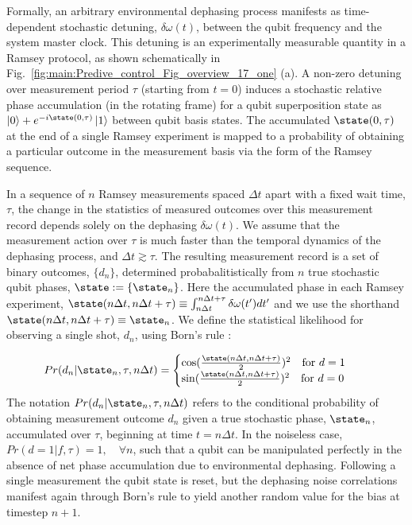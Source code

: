 Formally, an arbitrary environmental dephasing process manifests as time-dependent stochastic detuning, $\delta \omega (t)$, between the qubit frequency and the system master clock. This detuning is an experimentally measurable quantity in a Ramsey protocol, as shown schematically in Fig.~\ref{fig:main:Predive_control_Fig_overview_17_one} (a). A non-zero detuning over measurement period $\tau$ (starting from $t=0$) induces a stochastic relative phase accumulation (in the rotating frame) for a qubit superposition state as $\left|0\right\rangle+e^{-i\state(0, \tau)}\left|1\right\rangle$ between qubit basis states.  The accumulated $\state(0, \tau)$ at the end of a single Ramsey experiment is mapped to a probability of obtaining a particular outcome in the measurement basis via the form of the Ramsey sequence.  

In a sequence of $n$ Ramsey measurements spaced $\Delta t$ apart with a fixed wait time, $\tau$, the change in the statistics of measured outcomes over this measurement record depends solely on the dephasing  $\delta \omega(t)$.   We assume that the measurement action over $\tau$ is much faster than the temporal dynamics of the dephasing process, and $\Delta t \gtrsim \tau$. The resulting measurement record is a set of binary outcomes,  $\{d_n\}$, determined probabalitistically from $n$ true stochastic qubit phases, $\state := \{\state_n\}$. Here the accumulated phase in each Ramsey experiment, $ \state(n \Delta t, n\Delta t + \tau) \equiv \int_{n \Delta t}^{n \Delta t +\tau} \delta \omega(t') dt'$ and we use the shorthand $\state(n \Delta t , n\Delta t + \tau) \equiv \state_n$.  We define the statistical likelihood for observing a single shot, $d_n$, using Born's rule \cite{ferrie2013}:

\begin{align}
Pr(d_n | \state_n, \tau, n \Delta t) &= \begin{cases} \cos(\frac{\state(n \Delta t, n\Delta t + \tau)}{2})^2 \quad \text{for $d=1$} \\   \sin(\frac{\state(n \Delta t, n\Delta t + \tau)}{2})^2  \quad \text{for $ d=0$} \end{cases} \label{eqn:main:likelihood}
\end{align}
The notation $Pr(d_n | \state_n, \tau, n \Delta t)$ refers to the conditional probability of obtaining measurement outcome $d_n$ given a true stochastic phase, $\state_n$, accumulated over $\tau$, beginning at time $t = n \Delta t$. In the noiseless case, $Pr(d=1| f, \tau) = 1, \quad \forall n $, such that a qubit can be manipulated perfectly in the absence of net phase accumulation due to environmental dephasing. Following a single measurement the qubit state is reset, but the dephasing noise correlations manifest again through Born's rule to yield another random value for the bias at timestep $n+1$. %

